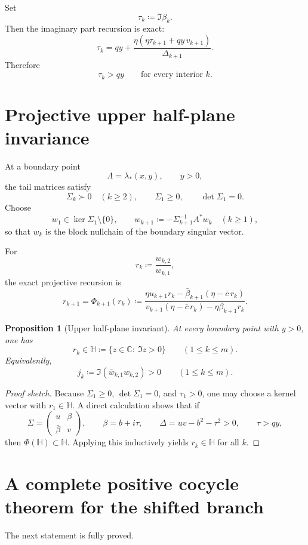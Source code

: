 \documentclass[11pt]{article}
\newtheorem{proposition}[theorem]{Proposition}
\newcommand{\C}{\mathbb C}
\begin{document}
Set
\[
\tau_k\coloneqq \Im \beta_k.
\]
Then the imaginary part recursion is exact:
\[
\tau_k
=
qy+\frac{\eta(\eta\tau_{k+1}+qy\,v_{k+1})}{\Delta_{k+1}}.
\]
Therefore
\[
\tau_k>qy
\qquad\text{for every interior }k.
\]

\section{Projective upper half-plane invariance}

At a boundary point
\[
\Lambda=\lambda_*(x,y),
\qquad y>0,
\]
the tail matrices satisfy
\[
\Sigma_k\succ 0 \quad (k\ge 2),
\qquad
\Sigma_1\ge 0,
\qquad
\det\Sigma_1=0.
\]
Choose
\[
w_1\in \ker \Sigma_1\setminus\{0\},
\qquad
w_{k+1}\coloneqq -\Sigma_{k+1}^{-1}A^*w_k
\quad (k\ge 1),
\]
so that \(w_k\) is the block nullchain of the boundary singular vector.

For
\[
r_k\coloneqq \frac{w_{k,2}}{w_{k,1}},
\]
the exact projective recursion is
\[
r_{k+1}
=
\Phi_{k+1}(r_k)
\coloneqq
\frac{\eta u_{k+1}r_k-\bar\beta_{k+1}(\eta-\bar c\,r_k)}
{v_{k+1}(\eta-\bar c\,r_k)-\eta\beta_{k+1}r_k}.
\]

\begin{proposition}[Upper half-plane invariant]\label{prop:H}
At every boundary point with \(y>0\), one has
\[
r_k\in \mathbb H\coloneqq \{z\in\C:\ \Im z>0\}
\qquad (1\le k\le m).
\]
Equivalently,
\[
j_k\coloneqq \Im(\bar w_{k,1}w_{k,2})>0
\qquad (1\le k\le m).
\]
\end{proposition}

\begin{proof}[Proof sketch]
Because \(\Sigma_1\ge 0\), \(\det\Sigma_1=0\), and \(\tau_1>0\), one may choose a kernel vector
with \(r_1\in\mathbb H\). A direct calculation shows that if
\[
\Sigma=
\begin{pmatrix}
u & \beta\\
\bar\beta & v
\end{pmatrix},
\qquad
\beta=b+i\tau,
\qquad
\Delta=uv-b^2-\tau^2>0,
\qquad
\tau>qy,
\]
then \(\Phi(\mathbb H)\subset\mathbb H\). Applying this inductively yields
\(r_k\in\mathbb H\) for all \(k\).
\end{proof}

\section{A complete positive cocycle theorem for the shifted branch}

The next statement is fully proved.
\end{document}
